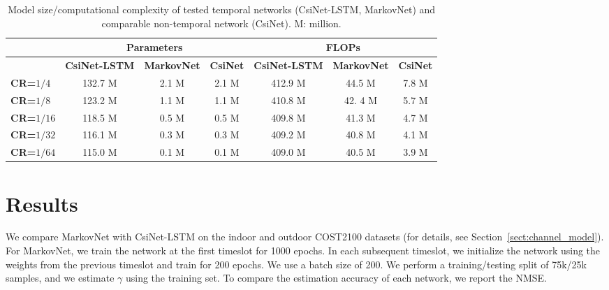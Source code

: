 \begin{table}[htb]
  \renewcommand{\arraystretch}{1}
  \begin{center}
  \caption{Model size/computational complexity of tested temporal networks (CsiNet-LSTM, MarkovNet) and comparable non-temporal network (CsiNet). M: million.}
  \label{tab:comp-complex} 
  \footnotesize{
	  \begin{tabular}{|l|c|c|c|c|c|c|}
	  \hline
	                              & \multicolumn{3}{c|}{\textbf{Parameters}} & \multicolumn{3}{c|}{\textbf{FLOPs}} \\ \hline
	                              & \textbf{CsiNet-LSTM} & \textbf{MarkovNet} & \textbf{CsiNet} & \textbf{CsiNet-LSTM} & \textbf{MarkovNet} & \textbf{CsiNet} \\ \hline
	  \textbf{CR=$1/4$}  		  & 132.7 M              & 2.1 M              & 2.1 M  			& 412.9 M              & 44.5 M             & 7.8 M           \\ \hline
	  \textbf{CR=$1/8$}  		  & 123.2 M              & 1.1 M              & 1.1 M  			& 410.8 M              & 42.	4 M             & 5.7 M           \\ \hline
	  \textbf{CR=$1/16$} 		  & 118.5 M              & 0.5 M              & 0.5 M 			& 409.8 M              & 41.3 M             & 4.7 M           \\ \hline
	  \textbf{CR=$1/32$} 		  & 116.1 M              & 0.3 M              & 0.3 M           & 409.2 M              & 40.8 M             & 4.1 M           \\ \hline
	  \textbf{CR=$1/64$} 		  & 115.0 M              & 0.1 M              & 0.1 M 			& 409.0 M              & 40.5 M             & 3.9 M           \\ \hline
	  \end{tabular}
  }
  \end{center}
\end{table} 

\section{Results}

We compare MarkovNet with CsiNet-LSTM \cite{ref:Wang2019CsiNetLSTM} on the indoor and outdoor COST2100 datasets (for details, see Section~\ref{sect:channel_model}). For MarkovNet, we train the network at the first timeslot for 1000 epochs. In each subsequent timeslot, we initialize the network using the weights from the previous timeslot and train for 200 epochs. We use a batch size of 200. We perform a training/testing split of 75k/25k samples, and we estimate $\gamma$ using the training set. To compare the estimation accuracy of each network, we report the NMSE.

